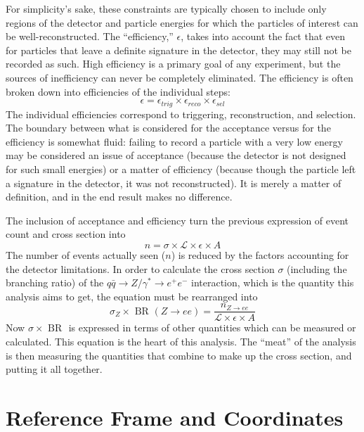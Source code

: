 For simplicity's sake, 
these constraints are typically chosen to include 
only regions of the detector 
and particle energies 
for which the particles of interest can be well-reconstructed.  
The ``efficiency,'' $\epsilon$, 
takes into account the fact that 
even for particles that leave a definite 
signature in the detector, 
they may still not be recorded as such.  
High efficiency is a primary goal of any 
experiment, 
but the sources of inefficiency can never be 
completely eliminated.  
The efficiency is often broken down into 
efficiencies of the individual steps: 
\[
\epsilon = \epsilon_{ trig } \times \epsilon_{ reco } \times \epsilon_{ sel }
\]
The individual efficiencies correspond to 
triggering, reconstruction, and selection.  %
The boundary between what is considered 
for the acceptance versus for the efficiency 
is somewhat fluid: 
failing to record a particle 
with a very low energy may be 
considered an issue of acceptance 
(because the detector is not designed 
for such small energies) 
or a matter of efficiency 
(because though the particle left 
a signature in the detector, 
it was not reconstructed).  
It is merely a matter of definition, 
and in the end result makes no difference.  

The inclusion of acceptance and efficiency 
turn the previous expression 
of event count and cross section into 
\[
n = \sigma \times \mathcal{ L } \times \epsilon \times A
\]
The number of events actually seen ($n$) is reduced 
by the factors accounting for the detector limitations.  
In order to calculate the cross section $\sigma$ 
(including the branching ratio) 
of the 
$ q\bar{q} \rightarrow Z/ \gamma^{*} \rightarrow e^{+} e^{-} $ 
interaction, 
which is the quantity this analysis aims to get, 
the equation must be rearranged into 
\[
\sigma_{ Z } \times \textrm{ BR }( Z \rightarrow ee ) = \frac{ n_{ Z \rightarrow ee } }{ \mathcal{ L } \times \epsilon \times A}
\]
Now $\sigma \times \textrm{ BR }$ is expressed 
in terms of other quantities which 
can be measured or calculated.  
This equation is the heart of this analysis.  
The ``meat'' of the analysis is then 
measuring the quantities that combine to 
make up the cross section, 
and putting it all together.  


\section{Reference Frame and Coordinates}

